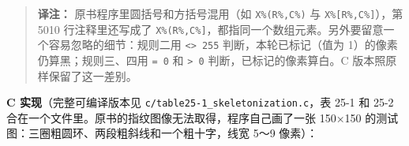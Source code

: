 \begin{Shaded}
\begin{Highlighting}[]
\NormalTok{5380 \textquotesingle{}}
\NormalTok{5390 \textquotesingle{}}
\NormalTok{5420 \textquotesingle{}}
\end{Highlighting}
\end{Shaded}

\begin{quote}
\textbf{译注：} 原书程序里圆括号和方括号混用（如 \texttt{X\%(R\%,C\%)}
与 \texttt{X\%{[}R\%,C\%{]}}），第 5010 行注释里还写成了
\texttt{X\%(R\%,C\%{]}}，都指同一个数组元素。另外要留意一个容易忽略的细节：规则二用
\texttt{\textless{}\textgreater{}\ 255} 判断，本轮已标记（值为
1）的像素仍算黑；规则三、四用 \texttt{=\ 0} 和
\texttt{\textgreater{}\ 0} 判断，已标记的像素算白。C
版本照原样保留了这一差别。
\end{quote}

\textbf{C 实现}（完整可编译版本见
\texttt{c/table25-1\_skeletonization.c}，表 25-1 和 25-2
合在一个文件里。原书的指纹图像无法取得，程序自己画了一张 150×150
的测试图：三圈粗圆环、两段粗斜线和一个粗十字，线宽 5～9 像素）：

